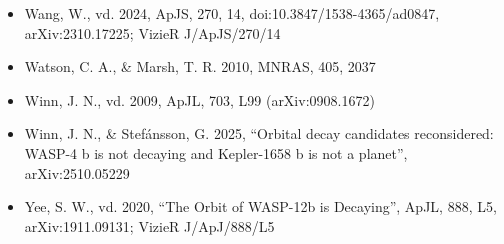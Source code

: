 \begin{small}
\begin{itemize}[leftmargin=*,itemsep=0.1em]
\item Wang, W., vd. 2024, ApJS, 270, 14, doi:10.3847/1538-4365/ad0847, arXiv:2310.17225; VizieR J/ApJS/270/14
\item Watson, C. A., \& Marsh, T. R. 2010, MNRAS, 405, 2037
\item Winn, J. N., vd. 2009, ApJL, 703, L99 (arXiv:0908.1672)
\item Winn, J. N., \& Stefánsson, G. 2025, “Orbital decay candidates reconsidered: WASP-4 b is not decaying and Kepler-1658 b is not a planet”, arXiv:2510.05229
\item Yee, S. W., vd. 2020, “The Orbit of WASP-12b is Decaying”, ApJL, 888, L5, arXiv:1911.09131; VizieR J/ApJ/888/L5
\end{itemize}
\end{small}


